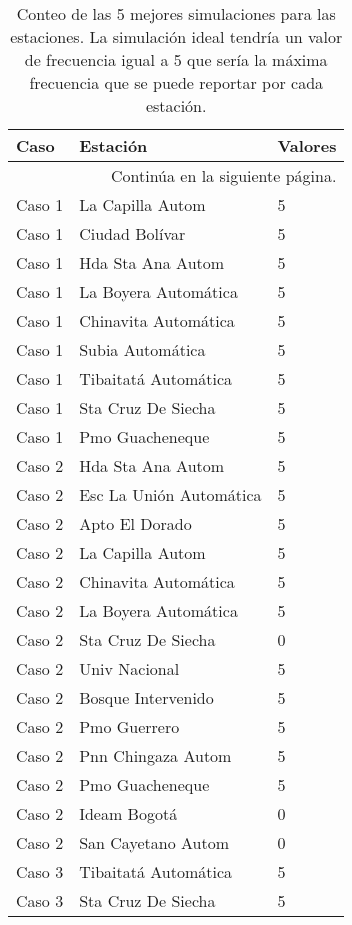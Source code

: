 \begin{longtable}{lll}

\caption{Conteo de las 5 mejores simulaciones para las estaciones. La simulación ideal tendría un valor de frecuencia igual a 5 que sería la máxima frecuencia que se puede reportar por cada estación.}
\label{tab_estaciones_5_tiempo}\\
\hline
Caso & Estación & Valores \\

\midrule
\endhead
\midrule
\multicolumn{3}{r}{{Continúa en la siguiente página.}} \\
\midrule
\endfoot

\bottomrule
\endlastfoot


Caso 1 & La Capilla Autom  & 5\\
Caso 1 & Ciudad Bolívar  & 5\\
Caso 1 & Hda Sta Ana Autom  & 5\\
Caso 1 & La Boyera Automática  & 5\\
Caso 1 & Chinavita Automática  & 5\\
Caso 1 & Subia Automática  & 5\\
Caso 1 & Tibaitatá Automática  & 5\\
Caso 1 & Sta Cruz De Siecha  & 5\\
Caso 1 & Pmo Guacheneque  & 5\\
Caso 2 & Hda Sta Ana Autom  & 5\\
Caso 2 & Esc La Unión Automática & 5\\
Caso 2 & Apto El Dorado  & 5\\
Caso 2 & La Capilla Autom  & 5\\
Caso 2 & Chinavita Automática  & 5\\
Caso 2 & La Boyera Automática  & 5\\
Caso 2 & Sta Cruz De Siecha  & 0\\
Caso 2 & Univ Nacional  & 5\\
Caso 2 & Bosque Intervenido    & 5\\
Caso 2 & Pmo Guerrero  & 5\\
Caso 2 & Pnn Chingaza Autom   & 5\\
Caso 2 & Pmo Guacheneque  & 5\\
Caso 2 & Ideam Bogotá  & 0\\
Caso 2 & San Cayetano Autom   & 0\\
Caso 3 & Tibaitatá Automática  & 5\\
Caso 3 & Sta Cruz De Siecha  & 5\\

\end{longtable}
